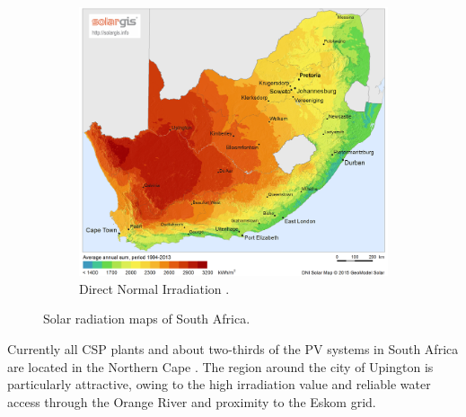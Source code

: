 \begin{figure}[h!]
\begin{subfigure}[b]{0.5\textwidth}
                \includegraphics[width=1\textwidth]{FIG/SA_DNI}
                \caption{Direct Normal Irradiation \cite{SolarGIS2015b}.}\label{fig:bild-rechts}
        \end{subfigure}
        \caption{Solar radiation maps of South Africa.}\label{irradiation}
\end{figure}
\pagebreak

Currently all CSP plants and about two-thirds of the PV systems in South Africa are located in the Northern Cape \cite{Forder2015}. The region around the city of Upington is particularly attractive, owing to the high irradiation value and reliable water access through the Orange River and proximity to the Eskom grid.

